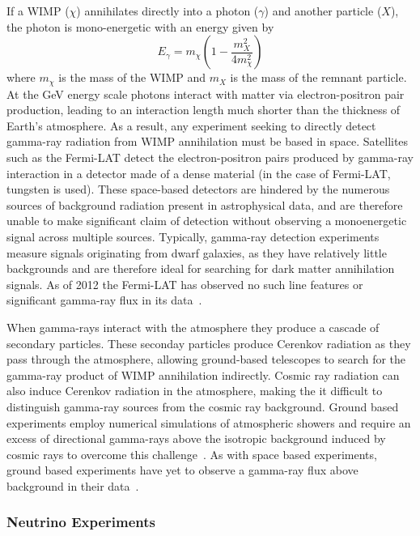 If a WIMP ($\chi$) annihilates directly into a photon ($\gamma$) and another particle ($X$), the photon is mono-energetic with an energy given by
\begin{equation} \label{WIMP-penergy}
E_{\gamma} = m_{\chi} \left(1-\frac{m_X^2}{4m_\chi^2} \right)
\end{equation}
where $m_\chi$ is the mass of the WIMP and $m_X$ is the mass of the remnant particle.~\cite{Fermit-LAT} At the GeV energy scale photons interact with matter via electron-positron pair production, leading to an interaction length much shorter than the thickness of Earth's atmosphere.  As a result, any experiment seeking to directly detect gamma-ray radiation from WIMP annihilation must be based in space.  Satellites such as the Fermi-LAT detect the electron-positron pairs produced by gamma-ray interaction in a detector made of a dense material (in the case of Fermi-LAT, tungsten is used).  These space-based detectors are hindered by the numerous sources of background radiation present in astrophysical data, and are therefore unable to make significant claim of detection without observing a monoenergetic signal across multiple sources.  Typically, gamma-ray detection experiments measure signals originating from dwarf galaxies, as they have relatively little backgrounds and are therefore ideal for searching for dark matter annihilation signals.   As of 2012 the Fermi-LAT has observed no such line features or significant gamma-ray flux in its data~\cite{Fermi-LAT}. 

When gamma-rays interact with the atmosphere they produce a cascade of secondary particles.  These seconday particles produce Cerenkov radiation as they pass through the atmosphere, allowing ground-based telescopes to search for the gamma-ray product of WIMP annihilation indirectly.  Cosmic ray radiation can also induce Cerenkov radiation in the atmosphere, making the it difficult to distinguish gamma-ray sources from the cosmic ray background.  Ground based experiments employ numerical simulations of atmospheric showers and require an excess of directional gamma-rays above the isotropic background induced by cosmic rays to overcome this challenge~\cite{Knapp}.  As with space based experiments, ground based experiments have yet to observe a gamma-ray flux above background in their data~\cite{HESS}.

\subsubsection{Neutrino Experiments}

